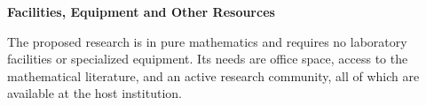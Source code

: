 \documentclass[11pt]{article}
\begin{document}
\begin{center}
  {\Large\bfseries Facilities, Equipment and Other Resources}
\end{center}

The proposed research is in pure mathematics and requires no laboratory facilities or
specialized equipment. Its needs are office space, access to the mathematical literature,
and an active research community, all of which are available at the host institution.








\end{document}
